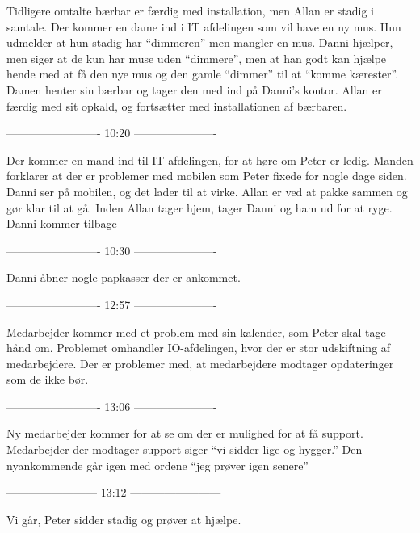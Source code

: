 \begin{linenumbers*}
Tidligere omtalte bærbar er færdig med installation, men Allan er stadig i samtale.
Der kommer en dame ind i IT afdelingen som vil have en ny mus.
Hun udmelder at hun stadig har “dimmeren” men mangler en mus.
Danni hjælper, men siger at de kun har muse uden “dimmere”, men at han godt kan hjælpe hende med at få den nye mus og den gamle “dimmer” til at “komme kærester”.
Damen henter sin bærbar og tager den med ind på Danni’s kontor.
Allan er færdig med sit opkald, og fortsætter med installationen af bærbaren.

------------------------- 10:20 ----------------------

Der kommer en mand ind til IT afdelingen, for at høre om Peter er ledig.
Manden forklarer at der er problemer med mobilen som Peter fixede for nogle dage siden.
Danni ser på mobilen, og det lader til at virke.
Allan er ved at pakke sammen og gør klar til at gå.
Inden Allan tager hjem, tager Danni og ham ud for at ryge.
Danni kommer tilbage

------------------------- 10:30 ----------------------

Danni åbner nogle papkasser der er ankommet.

------------------------- 12:57 ----------------------

Medarbejder kommer med et problem med sin kalender, som Peter skal tage hånd om.
Problemet omhandler IO-afdelingen, hvor der er stor udskiftning af medarbejdere.
Der er problemer med, at medarbejdere modtager opdateringer som de ikke bør.

------------------------- 13:06 ----------------------

Ny medarbejder kommer for at se om der er mulighed for at få support.
Medarbejder der modtager support siger “vi sidder lige og hygger.”
Den nyankommende går igen med ordene “jeg prøver igen senere”

------------------------ 13:12 ------------------------

Vi går, Peter sidder stadig og prøver at hjælpe.
\end{linenumbers*}